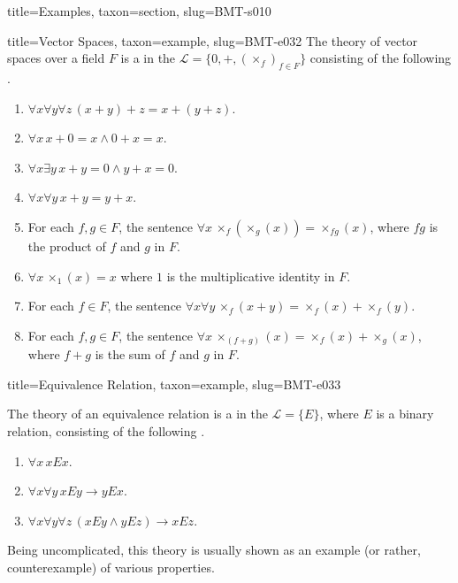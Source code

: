 \documentclass[a4paper]{article}
\begin{document}
\begin{tree}{title={Examples}, taxon={section}, slug={BMT-s010}}
\begin{tree}{title={Vector Spaces}, taxon={example}, slug={BMT-e032}}
    The theory of vector spaces over a field \(F\) is a  in the  \(\mathcal  L= \{ 0,+,( \times _f)_{f \in  F} \}\)
    consisting of the following .
    \begin{enumerate}
\item{\(\forall  x \forall  y \forall  z \, (x+y)+z=x+(y+z)\).
        }
        \item{\(\forall  x \, x+0=x \land0 +x=x\).
        }
        \item{\(\forall  x \exists  y \, x+y=0 \land  y+x=0\).
        }
        \item{\(\forall  x \forall  y \, x+y=y+x\).
        }
        \item{
            For each \(f,g \in  F\), the sentence \(\forall  x \, \times _f( \times _g(x)) =  \times _{fg}(x)\), where \(fg\) is the product of \(f\) and \(g\) in \(F\).
        }
        \item{\(\forall  x \, \times _1(x) = x\) where \(1\) is the multiplicative identity in \(F\).
        }
        \item{
            For each \(f \in  F\), the sentence \(\forall  x \forall  y \, \times _f(x+y) =  \times _f(x)+ \times _f(y)\).
        }
        \item{
            For each \(f,g \in  F\), the sentence \(\forall  x \, \times _(f+g)(x) =  \times _f(x)+ \times _g(x)\), where \(f+g\) is the sum of \(f\) and \(g\) in \(F\).
        }
\end{enumerate}
\end{tree}

\begin{tree}{title={Equivalence Relation}, taxon={example}, slug={BMT-e033}}

    The theory of an equivalence relation is a  in the  \(\mathcal  L= \{ E \}\),
    where \(E\) is a binary relation, consisting of the following .
    \begin{enumerate}
\item{\(\forall  x \, xEx\).
        }
        \item{\(\forall  x \forall  y \, xEy \rightarrow  yEx\).
        }
        \item{\(\forall  x \forall  y \forall  z \, (xEy \land  yEz) \rightarrow  xEz\).
        }
\end{enumerate}\par{
    Being uncomplicated, this theory is usually shown as an example (or rather, counterexample) of various properties.
}
\end{tree}

\end{tree}


\printbibliography
\end{document}
